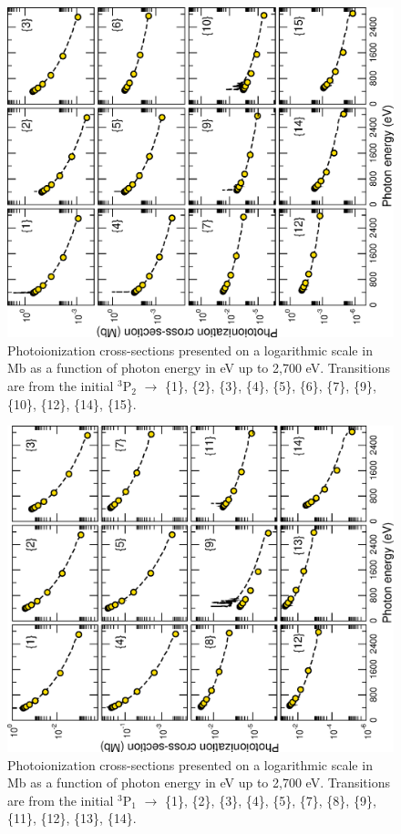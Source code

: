 %
\begin{figure}[hbt]
\centering
\includegraphics[scale=0.82, angle=-90]{Figures/Sulphur/open-adas/comparison1_new.eps}
\caption{Photoionization cross-sections presented on a logarithmic scale in Mb as a function of photon energy in eV up to 2,700 eV. Transitions are from the initial $^3$P$_2$ $\longrightarrow$ \{1\}, \{2\}, \{3\}, \{4\}, \{5\}, \{6\}, \{7\}, \{9\}, \{10\}, \{12\}, \{14\}, \{15\}. \label{fig:sul_adas2e}}
\end{figure}
%

%
\begin{figure}[hbt]
\centering
\includegraphics[scale=0.82, angle=-90]{Figures/Sulphur/open-adas/comparison2_new.eps}
\caption{Photoionization cross-sections presented on a logarithmic scale in Mb as a function of photon energy in eV up to 2,700 eV. Transitions are from the initial $^3$P$_1$ $\longrightarrow$ \{1\}, \{2\}, \{3\}, \{4\}, \{5\}, \{7\}, \{8\}, \{9\}, \{11\}, \{12\}, \{13\}, \{14\}. \label{fig:sul_adas1e}}
\end{figure}
%

